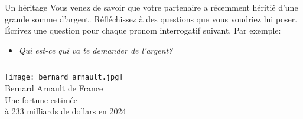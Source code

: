 \begin{frame}{Un héritage}
  Vous venez de savoir que votre partenaire a récemment héritié d'une grande somme d'argent.
  Réfléchissez à des questions que vous voudriez lui poser.
  Écrivez une question pour chaque pronom interrogatif suivant.
  Par exemple: \\
  \begin{itemize}
    \item \emph{Qui est-ce qui va te demander de l'argent?}
  \end{itemize}
  \begin{columns}
      \begin{center}
        \scriptsize
        \texttt{[image: bernard\_arnault.jpg]} \\
        Bernard Arnault de France \\
        Une fortune estimée \\
        à 233 milliards de dollars en 2024
      \end{center}
  \end{columns}
\end{frame}